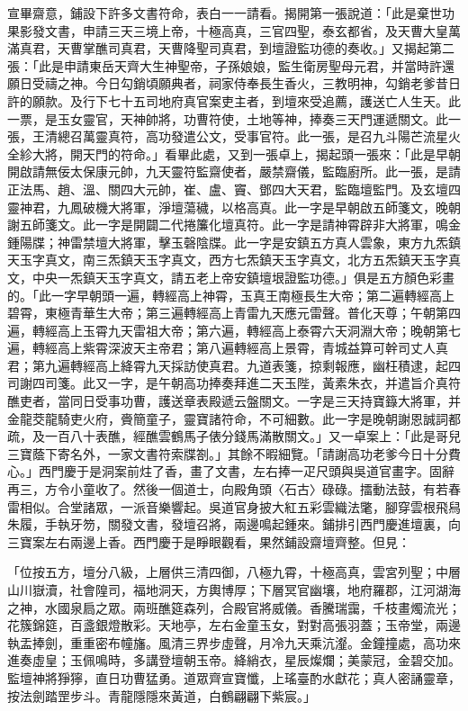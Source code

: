 宣畢齋意，鋪設下許多文書符命，表白一一請看。揭開第一張說道：「此是棄世功果影發文書，申請三天三境上帝，十極高真，三官四聖，泰玄都省，及天曹大皇萬滿真君，天曹掌醮司真君，天曹降聖司真君，到壇證監功德的奏收。」又揭起第二張：「此是申請東岳天齊大生神聖帝，子孫娘娘，監生衛房聖母元君，并當時許還願日受禱之神。今日勾銷頃願典者，祠家侍奉長生香火，三教明神，勾銷老爹昔日許的願款。及行下七十五司地府真官案吏主者，到壇來受追薦，護送亡人生天。此一票，是玉女靈官，天神帥將，功曹符使，土地等神，捧奏三天門運遞關文。此一張，王清總召萬靈真符，高功發遣公文，受事官符。此一張，是召九斗陽芒流星火全紾大將，開天門的符命。」看畢此處，又到一張卓上，揭起頭一張來：「此是早朝開啟請無佞太保康元帥，九天靈符監齋使者，嚴禁齋儀，監臨廚所。此一張，是請正法馬、趙、溫、關四大元帥，崔、盧、竇、鄧四大天君，監臨壇監門。及玄壇四靈神君，九鳳破機大將軍，淨壇蕩穢，以格高真。此一字是早朝啟五師箋文，晚朝謝五師箋文。此一字是開闢二代捲簾化壇真符。此一字是請神霄辟非大將軍，鳴金鍾陽牒；神雷禁壇大將軍，擊玉磬陰牒。此一字是安鎮五方真人雲象，東方九炁鎮天玉字真文，南三炁鎮天玉字真文，西方七炁鎮天玉字真文，北方五炁鎮天玉字真文，中央一炁鎮天玉字真文，請五老上帝安鎮壇垠證監功德。」俱是五方顏色彩畫的。「此一字早朝頭一遍，轉經高上神霄，玉真王南極長生大帝；第二遍轉經高上碧霄，東極青華生大帝；第三遍轉經高上青雷九天應元雷聲。普化天尊；午朝第四遍，轉經高上玉霄九天雷祖大帝；第六遍，轉經高上泰霄六天洞淵大帝；晚朝第七遍，轉經高上紫霄深波天主帝君；第八遍轉經高上景霄，青城益算可幹司丈人真君；第九遍轉經高上絳霄九天採訪使真君。九道表箋，掠剩報應，幽枉積逮，起四司謝四司箋。此又一字，是午朝高功捧奏拜進二天玉陛，黃素朱衣，并遣旨介真符醮吏者，當同日受事功曹，護送章表殿遞云盤關文。一字是三天持寶籙大將軍，并金龍茭龍騎吏火府，賫簡童子，靈寶諸符命，不可細數。此一字是晚朝謝恩誠詞都疏，及一百八十表醮，經醮雲鶴馬子俵分錢馬滿散關文。」又一卓案上：「此是哥兒三寶蔭下寄名外，一家文書符索牒劄。」其餘不暇細覽。「請謝高功老爹今日十分費心。」西門慶于是洞案前炷了香，畫了文書，左右捧一疋尺頭與吳道官畫字。固辭再三，方令小童收了。然後一個道士，向殿角頭〈石古〉碌碌。擂動法鼓，有若春雷相似。合堂諸眾，一派音樂響起。吳道官身披大紅五彩雲織法氅，腳穿雲根飛舄朱履，手執牙笏，關發文書，發壇召將，兩邊鳴起鍾來。鋪排引西門慶進壇裏，向三寶案左右兩邊上香。西門慶于是睜眼觀看，果然鋪設齋壇齊整。但見：

「位按五方，壇分八級，上層供三清四御，八極九霄，十極高真，雲宮列聖；中層山川嶽瀆，社會隍司，福地洞天，方輿博厚；下層冥官幽壤，地府羅郡，江河湖海之神，水國泉扃之眾。兩班醮筵森列，合殿官將威儀。香騰瑞靄，千枝畫燭流光；花簇錦筵，百盞銀燈散彩。天地亭，左右金童玉女，對對高張羽蓋；玉帝堂，兩邊執盂捧劍，重重密布幢旛。風清三界步虛聲，月冷九天乘沆瀣。金鐘撞處，高功來進奏虛皇；玉佩鳴時，多講登壇朝玉帝。絳綃衣，星辰燦爛；美蒙冠，金碧交加。監壇神將猙獰，直日功曹猛勇。道眾齊宣寶懺，上瑤臺酌水獻花；真人密誦靈章，按法劍踏罡步斗。青龍隱隱來黃道，白鶴翩翩下紫宸。」

